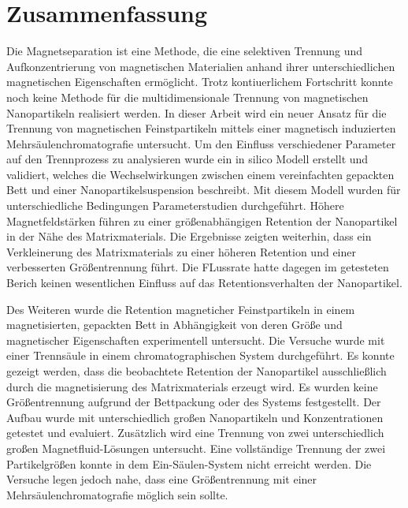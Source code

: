 \chapter{Zusammenfassung}
\label{ch:abstract_de}
Die Magnetseparation ist eine Methode, die eine selektiven Trennung und Aufkonzentrierung von magnetischen Materialien anhand ihrer unterschiedlichen magnetischen Eigenschaften ermöglicht. Trotz kontiuerlichem Fortschritt konnte noch keine Methode für die multidimensionale Trennung von magnetischen Nanopartikeln realisiert werden. In dieser Arbeit wird ein neuer Ansatz für die Trennung von magnetischen Feinstpartikeln mittels einer magnetisch induzierten Mehrsäulenchromatografie untersucht. Um den Einfluss verschiedener Parameter auf den Trennprozess zu analysieren wurde ein in silico Modell erstellt und validiert, welches die Wechselwirkungen zwischen einem vereinfachten gepackten Bett und einer Nanopartikelsuspension beschreibt. Mit diesem Modell wurden für unterschiedliche Bedingungen Parameterstudien durchgeführt. Höhere Magnetfeldstärken führen zu einer größenabhängigen Retention der Nanopartikel in der Nähe des Matrixmaterials. Die Ergebnisse zeigten weiterhin, dass ein Verkleinerung des Matrixmaterials zu einer höheren Retention und einer verbesserten Größentrennung führt. Die FLussrate hatte dagegen im getesteten Berich keinen wesentlichen Einfluss auf das Retentionsverhalten der Nanopartikel.

Des Weiteren wurde die Retention magneticher Feinstpartikeln
in einem magnetisierten, gepackten Bett in Abhängigkeit von deren Größe und magnetischer Eigenschaften experimentell untersucht. Die Versuche wurde mit einer Trennsäule in einem chromatographischen System durchgeführt. Es konnte gezeigt werden, dass die beobachtete Retention der Nanopartikel ausschließlich durch die magnetisierung des Matrixmaterials erzeugt wird. Es wurden keine Größentrennung aufgrund der Bettpackung oder des Systems festgestellt. Der Aufbau wurde mit unterschiedlich großen Nanopartikeln und Konzentrationen getestet und evaluiert. Zusätzlich wird eine Trennung von zwei unterschiedlich großen Magnetfluid-Lösungen untersucht. Eine vollständige Trennung der zwei Partikelgrößen konnte in dem Ein-Säulen-System nicht erreicht werden. Die Versuche legen jedoch nahe, dass eine Größentrennung mit einer Mehrsäulenchromatografie möglich sein sollte.  